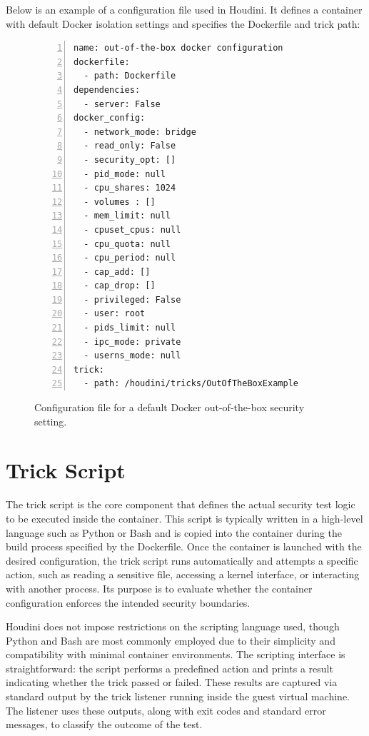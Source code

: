 \documentclass[12pt]{report}
\begin{document}
\begin{doublespace}
Below is an example of a configuration file used in Houdini. It defines a container with default Docker isolation settings and specifies the Dockerfile and trick path:

\begin{figure}[H]
\caption{Configuration file for a default Docker out-of-the-box security setting.}
\label{fig:configuration-file}
\begin{lstlisting}[caption={}, numbers=left, numberstyle=\tiny, stepnumber=1, breaklines=true, frame=single, backgroundcolor=\color{gray!10}, basicstyle=\ttfamily\scriptsize, showspaces=false, showstringspaces=false]
name: out-of-the-box docker configuration
dockerfile:
  - path: Dockerfile
dependencies:
  - server: False
docker_config: 
  - network_mode: bridge
  - read_only: False
  - security_opt: []
  - pid_mode: null
  - cpu_shares: 1024
  - volumes : []
  - mem_limit: null
  - cpuset_cpus: null
  - cpu_quota: null
  - cpu_period: null
  - cap_add: []
  - cap_drop: []
  - privileged: False
  - user: root
  - pids_limit: null
  - ipc_mode: private
  - userns_mode: null
trick:
  - path: /houdini/tricks/OutOfTheBoxExample
\end{lstlisting}
\end{figure}




\section{Trick Script}

The trick script is the core component that defines the actual security test logic to be executed inside the container. This script is typically written in a high-level language such as Python or Bash and is copied into the container during the build process specified by the Dockerfile. Once the container is launched with the desired configuration, the trick script runs automatically and attempts a specific action, such as reading a sensitive file, accessing a kernel interface, or interacting with another process. Its purpose is to evaluate whether the container configuration enforces the intended security boundaries.

Houdini does not impose restrictions on the scripting language used, though Python and Bash are most commonly employed due to their simplicity and compatibility with minimal container environments. The scripting interface is straightforward: the script performs a predefined action and prints a result indicating whether the trick passed or failed. These results are captured via standard output by the trick listener running inside the guest virtual machine. The listener uses these outputs, along with exit codes and standard error messages, to classify the outcome of the test.


\end{doublespace}
\end{document}
